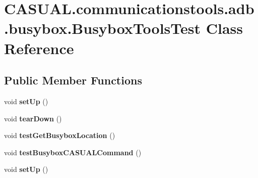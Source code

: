 \hypertarget{class_c_a_s_u_a_l_1_1communicationstools_1_1adb_1_1busybox_1_1_busybox_tools_test}{\section{C\-A\-S\-U\-A\-L.\-communicationstools.\-adb.\-busybox.\-Busybox\-Tools\-Test Class Reference}
\label{class_c_a_s_u_a_l_1_1communicationstools_1_1adb_1_1busybox_1_1_busybox_tools_test}
}
\subsection*{Public Member Functions}
\begin{DoxyCompactItemize}
\item 
\hypertarget{class_c_a_s_u_a_l_1_1communicationstools_1_1adb_1_1busybox_1_1_busybox_tools_test_a13a31c4e92085518a113207c8dbf044e}{void {\bfseries set\-Up} ()}\label{class_c_a_s_u_a_l_1_1communicationstools_1_1adb_1_1busybox_1_1_busybox_tools_test_a13a31c4e92085518a113207c8dbf044e}

\item 
\hypertarget{class_c_a_s_u_a_l_1_1communicationstools_1_1adb_1_1busybox_1_1_busybox_tools_test_a12d381c2f82c841b6dad35ca171b2079}{void {\bfseries tear\-Down} ()}\label{class_c_a_s_u_a_l_1_1communicationstools_1_1adb_1_1busybox_1_1_busybox_tools_test_a12d381c2f82c841b6dad35ca171b2079}

\item 
\hypertarget{class_c_a_s_u_a_l_1_1communicationstools_1_1adb_1_1busybox_1_1_busybox_tools_test_a80165446e3a3945be129e3811358091c}{void {\bfseries test\-Get\-Busybox\-Location} ()}\label{class_c_a_s_u_a_l_1_1communicationstools_1_1adb_1_1busybox_1_1_busybox_tools_test_a80165446e3a3945be129e3811358091c}

\item 
\hypertarget{class_c_a_s_u_a_l_1_1communicationstools_1_1adb_1_1busybox_1_1_busybox_tools_test_ab0a6398a2be2e08a0490b1e96b9f1b87}{void {\bfseries test\-Busybox\-C\-A\-S\-U\-A\-L\-Command} ()}\label{class_c_a_s_u_a_l_1_1communicationstools_1_1adb_1_1busybox_1_1_busybox_tools_test_ab0a6398a2be2e08a0490b1e96b9f1b87}

\item 
\hypertarget{class_c_a_s_u_a_l_1_1communicationstools_1_1adb_1_1busybox_1_1_busybox_tools_test_a13a31c4e92085518a113207c8dbf044e}{void {\bfseries set\-Up} ()}\label{class_c_a_s_u_a_l_1_1communicationstools_1_1adb_1_1busybox_1_1_busybox_tools_test_a13a31c4e92085518a113207c8dbf044e}


\end{DoxyCompactItemize}
